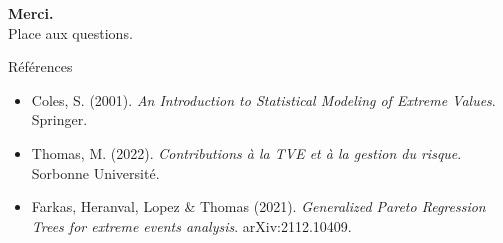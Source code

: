 \documentclass[10pt, aspectratio=1610]{beamer}
\begin{document}
\begin{frame}[plain]
    \begin{center}
        \vspace{2cm}
        {\Huge \textbf{Merci.}}\\[1cm]
        {\Large Place aux questions.}
    \end{center}
\end{frame}

\begin{frame}{Références}
    \footnotesize
    \begin{itemize}
        \item[--] Coles, S. (2001). \textit{An Introduction to Statistical Modeling of Extreme Values}. Springer.
        \item[--] Thomas, M. (2022). \textit{Contributions à la TVE et à la gestion du risque}. Sorbonne Université.
        \item[--] Farkas, Heranval, Lopez \& Thomas (2021). \textit{Generalized Pareto Regression Trees for extreme events analysis}. arXiv:2112.10409.
    \end{itemize}
\end{frame}
\end{document}
